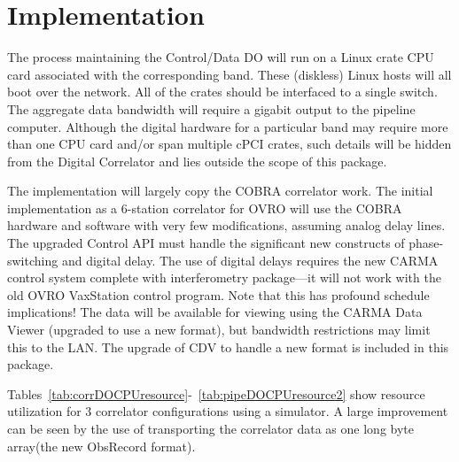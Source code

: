 \documentclass[11pt]{article}
\begin{document}
%
%
\section{Implementation}
%
%
The process maintaining the Control/Data DO will run on a Linux crate CPU card
associated with the corresponding band. 
These (diskless) Linux hosts will all boot over the network.
All of the crates should be interfaced to a single switch. The
aggregate data bandwidth will require a gigabit output to the pipeline
computer.  Although the digital hardware for a particular band may
require more than one CPU card and/or span multiple cPCI crates, such
details will be hidden from the Digital Correlator
and lies outside the scope of this package.

The implementation will largely copy the COBRA correlator work.
The initial implementation as a 6-station correlator for OVRO will use
the COBRA hardware and software with very few modifications, assuming
analog delay lines. The upgraded Control API
must handle the significant new constructs of phase-switching and
digital delay.
The use of digital delays requires the new CARMA control system complete
with interferometry package---it will not work with the old OVRO VaxStation
control program. Note that this has profound schedule implications!
The data will be available for viewing using the CARMA Data Viewer
(upgraded to use a new format), but bandwidth restrictions
may limit this to the LAN.
The upgrade of CDV to handle a new format is included in this
package.

Tables~\ref{tab:corrDOCPUresource}-~\ref{tab:pipeDOCPUresource2} show resource utilization for 3 correlator configurations using a simulator. A large
improvement can be seen by the use of transporting the correlator data as one
long byte array(the new ObsRecord format).
\end{document}
